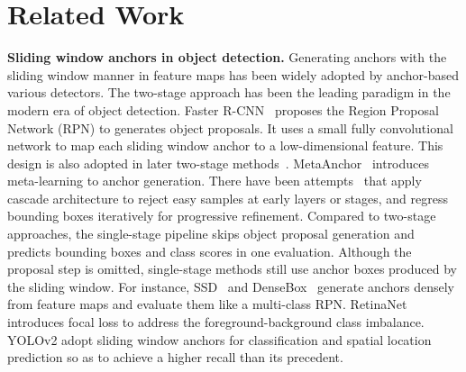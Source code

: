 \documentclass[10pt,twocolumn,letterpaper]{article}
\begin{document}
\section{Related Work}
\label{sec:related}



\noindent
\textbf{Sliding window anchors in object detection.}
Generating anchors with the sliding window manner in feature maps has been
widely adopted by anchor-based various detectors.
The two-stage approach has been the leading paradigm in the modern era of
object detection.
Faster R-CNN~\cite{ren2015faster} proposes the Region Proposal Network (RPN) to 
generates object proposals. It uses a small fully convolutional network to map
each sliding window anchor to a low-dimensional feature. This design is also
adopted in later two-stage methods~\cite{dai2016r,lin2017feature,he2017mask}.
MetaAnchor~\cite{yang18metaanchor} introduces meta-learning to anchor generation.
There have been attempts~\cite{ghodrati2015deepproposal,gidaris2015object,najibi2016g,yang2016craft,zhang2017single,zhong2017cascade,cai18cascadercnn,chen2019hybrid}
that apply cascade architecture to reject easy samples at early layers or stages,
and regress bounding boxes iteratively for progressive refinement.
Compared to two-stage approaches, the single-stage pipeline skips object proposal generation and predicts bounding boxes and class scores in one evaluation.
Although the proposal step is omitted, single-stage methods still use anchor boxes produced by the sliding window.
For instance, SSD~\cite{liu2016ssd} and DenseBox~\cite{huang2015densebox}
generate anchors densely from feature maps and evaluate them like a multi-class RPN.
RetinaNet~\cite{lin2017focal} introduces focal loss to address the
foreground-background class imbalance. 
YOLOv2\cite{redmon2017yolo9000}
adopt sliding window anchors for classification and spatial location prediction so as to achieve a higher recall than its precedent.
\end{document}
